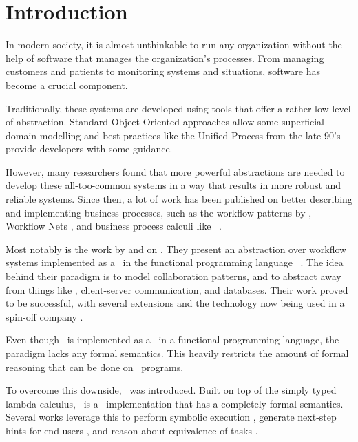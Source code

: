 
\section{Introduction}
\label{sec:introduction}

In modern society, it is almost unthinkable to run any organization without the help of software that manages the organization's processes.
From managing customers and patients to monitoring systems and situations, software has become a crucial component.

Traditionally, these systems are developed using tools that offer a rather low level of abstraction.
Standard Object-Oriented approaches allow some superficial domain modelling and best practices like the Unified Process from the late 90's provide developers with some guidance.

However, many researchers found that more powerful abstractions are needed to develop these all-too-common systems in a way that results in more robust and reliable systems.
Since then, a lot of work has been published on better describing and implementing business processes, such as the workflow patterns by \citeauthor{journals/dpd/AalstHKB03}, Workflow Nets \cite{journals/jcsc/Aalst98}, and business process calculi like \BPEL\ \cite{bpel}.

Most notably is the work by \citet{conf/ifl/KoopmanPA08} and \citet{conf/ppdp/PlasmeijerLMAK12} on \ITASKS.
They present an abstraction over workflow systems implemented as a \DSL\ in the functional programming language \CLEAN\ \cite{plasmeijer2002clean}.
The idea behind their paradigm is to model collaboration patterns, and to abstract away from things like \GUI, client-server communication, and databases.
Their work proved to be successful, with several extensions and the technology now being used in a spin-off company \cite{com/tss/viia}.

Even though \ITASKS\ is implemented as a \DSL\ in a functional programming language, the paradigm lacks any formal semantics.
This heavily restricts the amount of formal reasoning that can be done on \ITASKS\ programs.

To overcome this downside, \TOPHAT\ was introduced.
Built on top of the simply typed lambda calculus,
\TOPHAT\ is a \TOP\ implementation that has a completely formal semantics.
Several works leverage this to perform symbolic execution \cite{conf/ifl/NausSK19},
generate next-step hints for end users \cite{conf/sfp/NausS20},
and reason about equivalence of tasks \cite{conf/sfp/KlijnsmaS22}.

